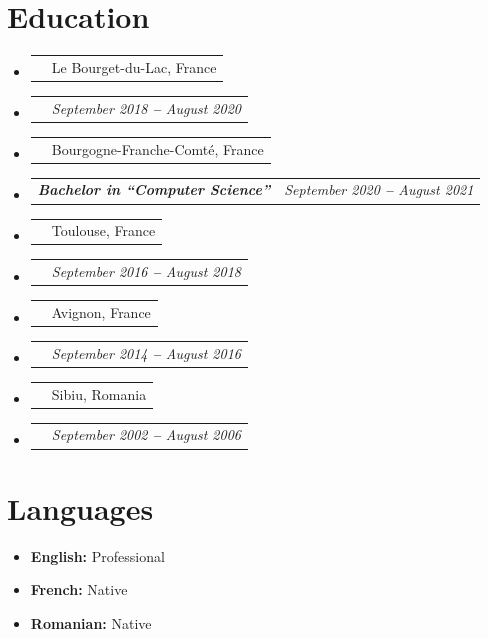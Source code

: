 \documentclass[letterpaper,11pt]{article}
\makeatletter
\newcommand{\bulletItem}[1]{
  \item\small{
    {#1}
  }
}
\newcommand{\companyNameAndLocationHeading}[2]{
  \item
    \begin{tabular*}{1.0\textwidth}[b]{l@{\extracolsep{\fill}}r}
      \textbf{#1} & #2
    \end{tabular*}
}
\newcommand{\titleAndDateHeading}[2]{
    \item
    \begin{tabular*}{1.0\textwidth}[b]{l@{\extracolsep{\fill}}r}
      {\bfseries\itshape\small #1} & \itshape\small #2
    \end{tabular*}
}
\newcommand{\sectionListStart}{\begin{itemize}[leftmargin=0pt, label={}]}
\newcommand{\sectionListEnd}{\end{itemize}}
\newcommand{\bref}[2]{\href{#1}{\color{blue}{#2}}}
\makeatother
\begin{document}
\section{Education}
\sectionListStart
\companyNameAndLocationHeading
{\bref{https://scem-eset.univ-smb.fr/}{Savoie Mont Blanc University}}{Le Bourget-du-Lac, France}
\titleAndDateHeading
{\bref{https://github.com/slalomeset/diplomas/blob/main/master.pdf}{Master's Degree in \enquote{Electronics of Embedded Systems and Telecommunications}}}{September 2018 \textbf{--} August 2020}

\companyNameAndLocationHeading
{\bref{https://sup-fc.univ-fcomte.fr/informatique}{University of Franche-Comté}}{Bourgogne-Franche-Comté, France}
\titleAndDateHeading
{Bachelor in \enquote{Computer Science}}{September 2020 \textbf{--} August 2021}

\companyNameAndLocationHeading
{\bref{https://www.univ-tlse3.fr/decouvrir-nos-diplomes/licence-parcours-eea-fondamental-eea-f}{Toulouse 3 University \enquote{Paul Sabatier}}}{Toulouse, France}
\titleAndDateHeading
{\bref{https://github.com/slalomeset/diplomas/blob/main/bachelor.pdf}{Bachelor in \enquote{Electronics, Electrical Engineering and Automation.}}}{September 2016 \textbf{--} August 2018}

\companyNameAndLocationHeading
{\bref{https://www.cned.fr/}{CNED \enquote{Centre National d'Enseignement à Distance}}}{Avignon, France}
\titleAndDateHeading
{\bref{https://github.com/slalomeset/diplomas/blob/main/bts.pdf}{BTEC HND in \enquote{Electrical Engineering and Electronics }}}{September 2014 \textbf{--} August 2016}

\companyNameAndLocationHeading
{\bref{https://www.armyacademy.ro/engleza/fmm.php}{\enquote{Nicolae Balcescu} Land Forces Academy }}{Sibiu, Romania }
\titleAndDateHeading
{\bref{https://github.com/slalomeset/diplomas/blob/main/military_academy.pdf}{ Bachelor's Degree in Management of Military Organizations }}{September 2002 \textbf{--} August 2006}
\sectionListEnd

\vspace{0.25em} %

\section{Languages}
\sectionListStart
\bulletItem{\textbf{English:}{ Professional} \bref{https://github.com/slalomeset/certificates/blob/main/toeic_english.pdf}{[TOEIC certificate]} }
\bulletItem{\textbf{French:}{ Native}}
\bulletItem{\textbf{Romanian:}{ Native}}
\sectionListEnd
\vspace{0.25em} %
\end{document}
